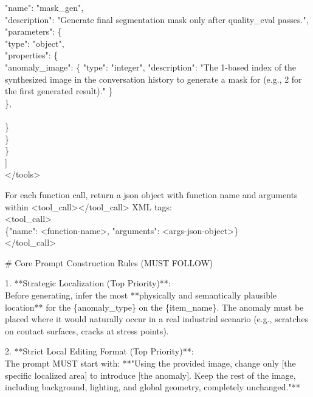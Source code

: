 \documentclass[sigconf]{acmart}
\begin{document}
\begin{tcolorbox}
\hspace*{3em}"name": "mask\_gen", \\
\hspace*{3em}"description": "Generate final segmentation mask only after quality\_eval passes.", \\
\hspace*{3em}"parameters": \{ \\
\hspace*{4em}"type": "object", \\
\hspace*{4em}"properties": \{ \\
\hspace*{5em}"anomaly\_image": \{ "type": "integer", "description": "The 1-based index of the synthesized image in the conversation history to generate a mask for (e.g., 2 for the first generated result)." \} \\
\hspace*{4em}\}, \\
\hspace*{4em}{"required": ["anomaly\_image"]} \\
\hspace*{3em}\} \\
\hspace*{2em}\} \\
\hspace*{1em}\} \\
{]} \\
</tools>

\vspace{1.5em}
For each function call, return a json object with function name and arguments within <tool\_call></tool\_call> XML tags: \\
<tool\_call> \\
\{"name": <function-name>, "arguments": <args-json-object>\} \\
</tool\_call>

\vspace{1.5em}
\# Core Prompt Construction Rules (MUST FOLLOW)

1. **Strategic Localization (Top Priority)**: \\
Before generating, infer the most **physically and semantically plausible location** for the \{anomaly\_type\} on the \{item\_name\}. The anomaly must be placed where it would naturally occur in a real industrial scenario (e.g., scratches on contact surfaces, cracks at stress points).

2. **Strict Local Editing Format (Top Priority)**: \\
The prompt MUST start with: **"Using the provided image, change only [the specific localized area] to introduce [the anomaly]. Keep the rest of the image, including background, lighting, and global geometry, completely unchanged."**


\end{tcolorbox}
\end{document}
